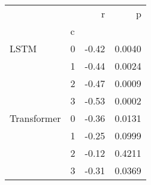 \begin{tabular}{llrr}
\toprule
            &   &     r &      p \\
{} & c &       &        \\
\midrule
LSTM & 0 & -0.42 & 0.0040 \\
            & 1 & -0.44 & 0.0024 \\
            & 2 & -0.47 & 0.0009 \\
            & 3 & -0.53 & 0.0002 \\
Transformer & 0 & -0.36 & 0.0131 \\
            & 1 & -0.25 & 0.0999 \\
            & 2 & -0.12 & 0.4211 \\
            & 3 & -0.31 & 0.0369 \\
\bottomrule
\end{tabular}
